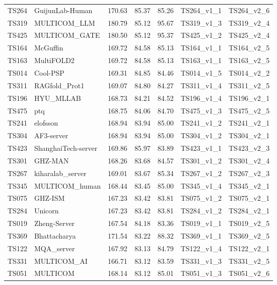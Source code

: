 \begin{longtable}{lllllll}
TS264 & GuijunLab-Human & 170.63 & 85.37 & 85.26 & TS264\_v1\_1 & TS264\_v2\_6 \\ 
TS319 & MULTICOM\_LLM & 180.79 & 85.12 & 95.67 & TS319\_v1\_3 & TS319\_v2\_4 \\ 
TS425 & MULTICOM\_GATE & 180.50 & 85.12 & 95.37 & TS425\_v1\_2 & TS425\_v2\_4 \\ 
TS164 & McGuffin & 169.72 & 84.58 & 85.13 & TS164\_v1\_1 & TS164\_v2\_5 \\ 
TS163 & MultiFOLD2 & 169.72 & 84.58 & 85.13 & TS163\_v1\_1 & TS163\_v2\_5 \\ 
TS014 & Cool-PSP & 169.31 & 84.85 & 84.46 & TS014\_v1\_5 & TS014\_v2\_2 \\ 
TS311 & RAGfold\_Prot1 & 169.07 & 84.80 & 84.27 & TS311\_v1\_4 & TS311\_v2\_5 \\ 
TS196 & HYU\_MLLAB & 168.73 & 84.21 & 84.52 & TS196\_v1\_4 & TS196\_v2\_1 \\ 
TS475 & ptq & 168.75 & 84.06 & 84.70 & TS475\_v1\_3 & TS475\_v2\_5 \\ 
TS241 & elofsson & 168.94 & 83.94 & 85.00 & TS241\_v1\_2 & TS241\_v2\_1 \\ 
TS304 & AF3-server & 168.94 & 83.94 & 85.00 & TS304\_v1\_2 & TS304\_v2\_1 \\ 
TS423 & ShanghaiTech-server & 169.86 & 85.97 & 83.89 & TS423\_v1\_1 & TS423\_v2\_3 \\ 
TS301 & GHZ-MAN & 168.26 & 83.68 & 84.57 & TS301\_v1\_2 & TS301\_v2\_4 \\ 
TS267 & kiharalab\_server & 169.01 & 83.67 & 85.34 & TS267\_v1\_2 & TS267\_v2\_3 \\ 
TS345 & MULTICOM\_human & 168.44 & 83.45 & 85.00 & TS345\_v1\_4 & TS345\_v2\_1 \\ 
TS075 & GHZ-ISM & 167.23 & 83.42 & 83.81 & TS075\_v1\_2 & TS075\_v2\_1 \\ 
TS284 & Unicorn & 167.23 & 83.42 & 83.81 & TS284\_v1\_2 & TS284\_v2\_1 \\ 
TS019 & Zheng-Server & 167.54 & 84.18 & 83.36 & TS019\_v1\_1 & TS019\_v2\_5 \\ 
TS369 & Bhattacharya & 171.54 & 83.22 & 88.32 & TS369\_v1\_1 & TS369\_v2\_5 \\ 
TS122 & MQA\_server & 167.92 & 83.13 & 84.79 & TS122\_v1\_4 & TS122\_v2\_1 \\ 
TS331 & MULTICOM\_AI & 166.71 & 83.12 & 83.59 & TS331\_v1\_3 & TS331\_v2\_5 \\ 
TS051 & MULTICOM & 168.14 & 83.12 & 85.01 & TS051\_v1\_3 & TS051\_v2\_6 \\ 

\end{longtable}
